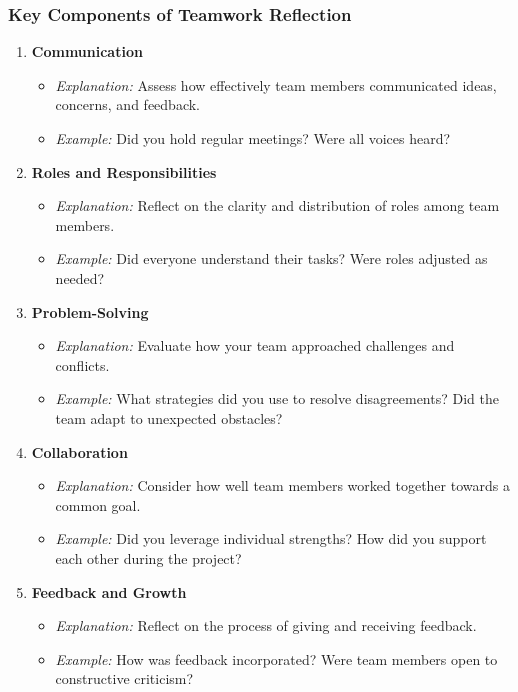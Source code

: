 \documentclass[aspectratio=169]{beamer}
\begin{document}
\begin{frame}[fragile]
    \frametitle{Key Components of Teamwork Reflection}
    \begin{enumerate}
        \item \textbf{Communication}
            \begin{itemize}
                \item \textit{Explanation:} Assess how effectively team members communicated ideas, concerns, and feedback.
                \item \textit{Example:} Did you hold regular meetings? Were all voices heard?
            \end{itemize}
        \item \textbf{Roles and Responsibilities}
            \begin{itemize}
                \item \textit{Explanation:} Reflect on the clarity and distribution of roles among team members.
                \item \textit{Example:} Did everyone understand their tasks? Were roles adjusted as needed?
            \end{itemize}
        \item \textbf{Problem-Solving}
            \begin{itemize}
                \item \textit{Explanation:} Evaluate how your team approached challenges and conflicts.
                \item \textit{Example:} What strategies did you use to resolve disagreements? Did the team adapt to unexpected obstacles?
            \end{itemize}
        \item \textbf{Collaboration}
            \begin{itemize}
                \item \textit{Explanation:} Consider how well team members worked together towards a common goal.
                \item \textit{Example:} Did you leverage individual strengths? How did you support each other during the project?
            \end{itemize}
        \item \textbf{Feedback and Growth}
            \begin{itemize}
                \item \textit{Explanation:} Reflect on the process of giving and receiving feedback.
                \item \textit{Example:} How was feedback incorporated? Were team members open to constructive criticism?
            \end{itemize}
    \end{enumerate}
\end{frame}
\end{document}
